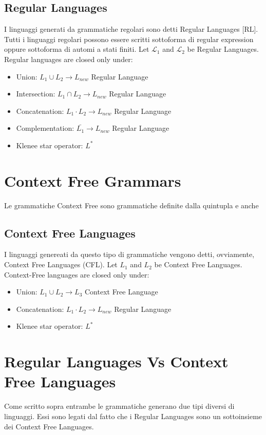 \subsection{Regular Languages}
I linguaggi generati da grammatiche regolari sono detti Regular Languages [RL].
Tutti i linguaggi regolari possono essere scritti sottoforma di regular expression oppure sottoforma di automi a stati finiti.
Let $\mathcal{L_1}$ and $\mathcal{L_2}$ be Regular Languages.
Regular languages are closed only under:
\begin{itemize}
\item Union: $L_1 \cup L_2 \rightarrow L_{new}$ Regular Language
\item Intersection: $L_1 \cap L_2 \rightarrow L_{new}$ Regular Language
\item Concatenation: $L_1 \cdot L_2 \rightarrow L_{new}$ Regular Language
\item Complementation: $\bar{L_1} \rightarrow L_{new}$ Regular Language
\item Klenee star operator: $L^*$
\end{itemize}
\section{Context Free Grammars}
Le grammatiche Context Free sono grammatiche definite dalla quintupla \newline e anche

\subsection{Context Free Languages}
I linguaggi genereati da questo tipo di grammatiche vengono detti, ovviamente, Context Free Languages (CFL).
Let $L_1$ and $L_2$ be Context Free Languages.
Context-Free languages are closed only under:
\begin{itemize}
\item Union: $L_1 \cup L_2 \rightarrow L_3$ Context Free Language
\item Concatenation: $L_1 \cdot L_2 \rightarrow L_{new}$ Regular Language
\item Klenee star operator: $L^*$
\end{itemize}

\section{Regular Languages Vs Context Free Languages}

Come scritto sopra entrambe le grammatiche generano due tipi diversi di linguaggi. Essi sono legati dal fatto che i Regular Languages sono un sottoinsieme dei Context Free Languages.